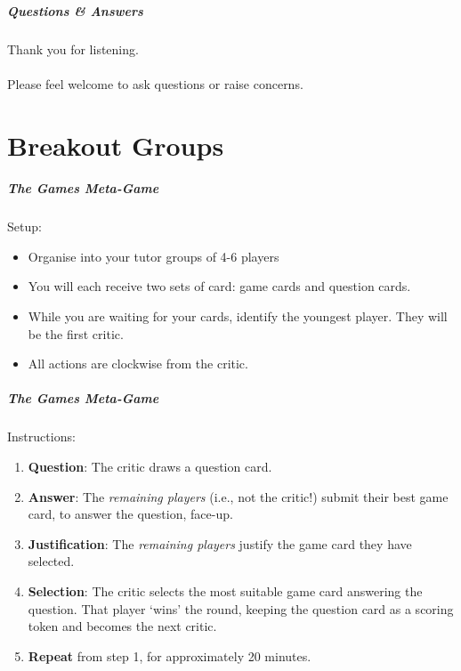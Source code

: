 
\begin{frame}
	\frametitle{Questions \& Answers}	
	\begin{center}
		Thank you for listening. 
		\\~\\
		Please feel welcome to ask questions or raise concerns.
	\end{center}
\end{frame}

\part{Breakout Groups}
\frame{\partpage}

\begin{frame}
	\frametitle{The Games Meta-Game}
	
	Setup:
	
	\begin{itemize}
		\item Organise into your tutor groups of 4-6 players
		\item You will each receive two sets of card: game cards and question cards.
		\item While you are waiting for your cards, identify the youngest player. They will be the first critic.
		\item All actions are clockwise from the critic.
	\end{itemize}
\end{frame}

\begin{frame}
	\frametitle{The Games Meta-Game}
	
	Instructions:
	
	\begin{enumerate}
		\item 	\textbf{Question}: The critic draws a question card. 
		\item 	\textbf{Answer}: The \textit{remaining players} (i.e., not the critic!) submit their best game card, to answer the question, face-up.
		\item 	\textbf{Justification}: The \textit{remaining players} justify the game card they have selected.
		\item 	\textbf{Selection}: The critic selects the most suitable game card answering the question. That player `wins' the round, keeping the question card as a scoring token and becomes the next critic.	
		\item 	\textbf{Repeat} from step 1, for approximately 20 minutes.	
	\end{enumerate}
\end{frame}

